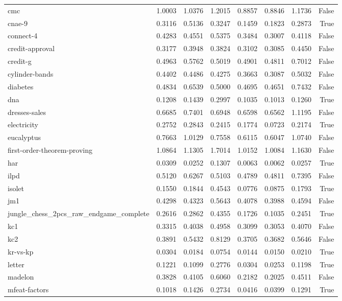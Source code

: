 \begin{table}[htbp]
\begin{tabular}{lrrrrrrr}
cmc & 1.0003 & 1.0376 & 1.2015 & 0.8857 & 0.8846 & 1.1736 & False \\
cnae-9 & 0.3116 & 0.5136 & 0.3247 & 0.1459 & 0.1823 & 0.2873 & True \\
connect-4 & 0.4283 & 0.4551 & 0.5375 & 0.3484 & 0.3007 & 0.4118 & False \\
credit-approval & 0.3177 & 0.3948 & 0.3824 & 0.3102 & 0.3085 & 0.4450 & False \\
credit-g & 0.4963 & 0.5762 & 0.5019 & 0.4901 & 0.4811 & 0.7012 & False \\
cylinder-bands & 0.4402 & 0.4486 & 0.4275 & 0.3663 & 0.3087 & 0.5032 & False \\
diabetes & 0.4834 & 0.6539 & 0.5000 & 0.4695 & 0.4651 & 0.7432 & False \\
dna & 0.1208 & 0.1439 & 0.2997 & 0.1035 & 0.1013 & 0.1260 & True \\
dresses-sales & 0.6685 & 0.7401 & 0.6948 & 0.6598 & 0.6562 & 1.1195 & False \\
electricity & 0.2752 & 0.2843 & 0.2415 & 0.1774 & 0.0723 & 0.2174 & True \\
eucalyptus & 0.7663 & 1.0129 & 0.7558 & 0.6115 & 0.6047 & 1.0740 & False \\
first-order-theorem-proving & 1.0864 & 1.1305 & 1.7014 & 1.0152 & 1.0084 & 1.1630 & False \\
har & 0.0309 & 0.0252 & 0.1307 & 0.0063 & 0.0062 & 0.0257 & True \\
ilpd & 0.5120 & 0.6267 & 0.5103 & 0.4789 & 0.4811 & 0.7395 & False \\
isolet & 0.1550 & 0.1844 & 0.4543 & 0.0776 & 0.0875 & 0.1793 & True \\
jm1 & 0.4298 & 0.4323 & 0.5643 & 0.4078 & 0.3988 & 0.4594 & False \\
jungle\_chess\_2pcs\_raw\_endgame\_complete & 0.2616 & 0.2862 & 0.4355 & 0.1726 & 0.1035 & 0.2451 & True \\
kc1 & 0.3315 & 0.4038 & 0.4958 & 0.3099 & 0.3053 & 0.4070 & False \\
kc2 & 0.3891 & 0.5432 & 0.8129 & 0.3705 & 0.3682 & 0.5646 & False \\
kr-vs-kp & 0.0304 & 0.0184 & 0.0754 & 0.0144 & 0.0150 & 0.0210 & True \\
letter & 0.1221 & 0.1099 & 0.2776 & 0.0304 & 0.0253 & 0.1198 & True \\
madelon & 0.3828 & 0.4105 & 0.6060 & 0.2182 & 0.2025 & 0.4511 & False \\
mfeat-factors & 0.1018 & 0.1426 & 0.2734 & 0.0416 & 0.0399 & 0.1291 & True \\

\end{tabular}
\end{table}

